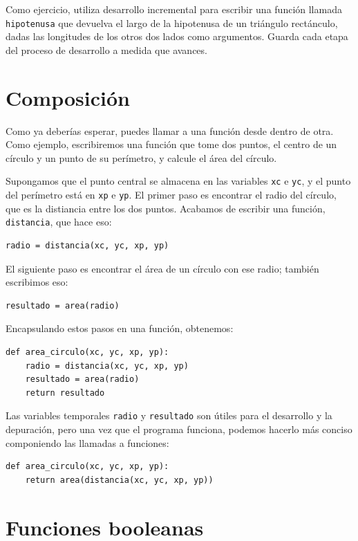 \documentclass[10pt]{book}
\begin{document}
Como ejercicio, utiliza desarrollo incremental para escribir una función
llamada {\tt hipotenusa} que devuelva el largo de la hipotenusa de un
triángulo rectánculo, dadas las longitudes de los otros dos lados como argumentos.
Guarda cada etapa del proceso de desarrollo a medida que avances.



\section{Composición}

Como ya deberías esperar, puedes llamar a una función desde dentro de
otra.  Como ejemplo, escribiremos una función que tome dos puntos,
el centro de un círculo y un punto de su perímetro, y calcule
el área del círculo.

Supongamos que el punto central se almacena en las variables {\tt xc} e
{\tt yc}, y el punto del perímetro está en {\tt xp} e {\tt yp}. El
primer paso es encontrar el radio del círculo, que es la distiancia
entre los dos puntos.  Acabamos de escribir una función, {\tt
distancia}, que hace eso:

\begin{verbatim}
radio = distancia(xc, yc, xp, yp)
\end{verbatim}
%
El siguiente paso es encontrar el área de un círculo con ese radio;
también escribimos eso:

\begin{verbatim}
resultado = area(radio)
\end{verbatim}
%
Encapsulando estos pasos en una función, obtenemos:

\begin{verbatim}
def area_circulo(xc, yc, xp, yp):
    radio = distancia(xc, yc, xp, yp)
    resultado = area(radio)
    return resultado
\end{verbatim}
%
Las variables temporales {\tt radio} y {\tt resultado} son útiles para
el desarrollo y la depuración, pero una vez que el programa funciona, podemos
hacerlo más conciso componiendo las llamadas a funciones:

\begin{verbatim}
def area_circulo(xc, yc, xp, yp):
    return area(distancia(xc, yc, xp, yp))
\end{verbatim}
%

\section{Funciones booleanas}
\label{boolean}
\end{document}

